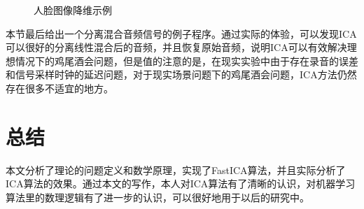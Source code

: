 \documentclass[UTF8,zihao=5,a4paper]{ctexart}
\begin{document}
\begin{figure}[h]
    \centering
    \hspace{0.2in}
    \hspace{0.2in}
    \caption{人脸图像降维示例}
    \label{fig:face}
\end{figure}


本节最后给出一个分离混合音频信号的例子程序。通过实际的体验，可以发现ICA可以很好的分离线性混合后的音频，并且恢复原始音频，说明ICA可以有效解决理想情况下的鸡尾酒会问题，但是值的注意的是，在现实实验中由于存在录音的误差和信号采样时钟的延迟问题，对于现实场景问题下的鸡尾酒会问题，ICA方法仍然存在很多不适宜的地方。

\section{总结}
本文分析了理论的问题定义和数学原理，实现了FastICA算法，并且实际分析了ICA算法的效果。通过本文的写作，本人对ICA算法有了清晰的认识，对机器学习算法里的数理逻辑有了进一步的认识，可以很好地用于以后的研究中。

% 

\end{document}
